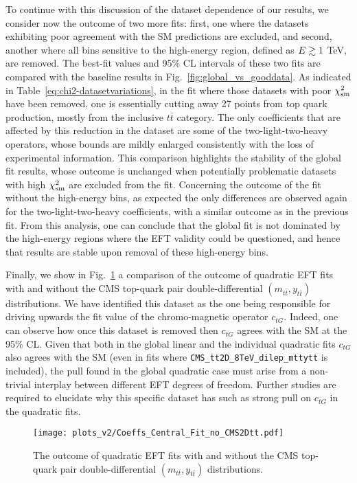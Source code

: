 To continue with this discussion of the dataset dependence of our results, we consider now
the outcome of
two more fits: first, one where the datasets exhibiting poor agreement with the SM predictions
are excluded, and second, another where all bins sensitive to the high-energy region,
defined as $E\gtrsim 1 $ TeV, are removed.
%
The best-fit values and 95\% CL intervals of these two fits are compared
with the baseline results in Fig.~\ref{fig:global_vs_gooddata}.
%
As indicated in Table~\ref{eq:chi2-datasetvariations}, in the fit where those
datasets with poor $\chi^2_{\rm sm}$
have been removed, one is essentially cutting away 27 points from top quark production, mostly
from the inclusive $t\bar{t}$ category.
%
The only coefficients that are affected by this reduction in the dataset are some of the
two-light-two-heavy operators, whose bounds are mildly enlarged consistently
with the loss of experimental information.
%
This comparison highlights the stability of the global fit results, whose
outcome is unchanged when potentially problematic datasets with high $\chi^2_{\rm sm}$
are excluded from the fit.
%
Concerning the outcome of the fit without the high-energy bins, as expected the only differences
are observed again for the two-light-two-heavy coefficients, with a similar
outcome as in the previous fit.
%
From this analysis, one can conclude that the global fit is not dominated by the high-energy regions
where the EFT validity could be questioned, and hence that results are stable
upon removal of these high-energy bins.

Finally, we show in Fig.~\ref{fig:wo_CMS2Dttbar} a comparison
of the outcome of quadratic EFT fits with and without
the CMS top-quark pair double-differential $(m_{t\bar{t}},y_{t\bar{t}})$ distributions.
%
We have identified this dataset as the one being responsible for
driving upwards the fit value of the chromo-magnetic
operator $c_{tG}$.
%
Indeed, 
one can observe how once this dataset is removed
then $c_{tG}$ agrees with the SM at the 95\% CL.
%
Given that both in the global linear and the individual quadratic fits
$c_{tG}$ also agrees with the SM (even in fits where {\tt CMS\_tt2D\_8TeV\_dilep\_mttytt}
is included), the pull found in the global quadratic case must arise from a non-trivial
interplay between different EFT degrees of freedom.
%
Further studies are required to elucidate why this specific dataset has such as strong
pull on $c_{tG}$ in the quadratic fits.

\begin{figure}[t]
  \begin{center}
    \texttt{[image: plots\_v2/Coeffs\_Central\_Fit\_no\_CMS2Dtt.pdf]}
   \caption{\label{fig:wo_CMS2Dttbar} \small
    The outcome of quadratic EFT fits with and without
   the CMS top-quark pair double-differential $(m_{t\bar{t}},y_{t\bar{t}})$ distributions.}
  \end{center}
\end{figure}



